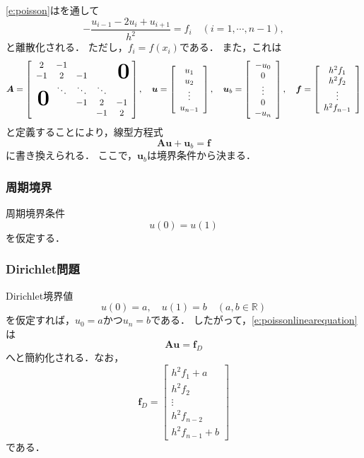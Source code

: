 \eqref{e:poisson}はを通して
$$
-\frac{u_{i-1}-2u_i+u_{i+1}}{h^2}=f_i\quad(i=1,\cdots,n-1),
$$
と離散化される．
ただし，$f_i=f(x_i)$である．
また，これは
\begin{equation}
\bm{A}=\left[\begin{array}{ccccc}
	2&-1&&&\\
	-1&2&-1&&\hsymb{\bm{0}}\\
	&\ddots&\ddots&\ddots&\\
	\hsymb{\bm{0}}&&-1&2&-1\\
	&&&-1&2
	\end{array}\right],\quad
\bm{u}=\left[\begin{array}{c}
	u_1\\
	u_2\\
	\vdots\\
	u_{n-1}
	\end{array}\right],\quad
\bm{u}_b=\left[\begin{array}{c}
	-u_0\\
	0\\
	\vdots\\
	0\\
	-u_{n}
	\end{array}\right],\quad
\bm{f}=\left[\begin{array}{c}
	h^2 f_1\\
	h^2 f_2\\
	\vdots\\
	h^2 f_{n-1}
	\end{array}\right]	
\end{equation}
と定義することにより，線型方程式
\begin{equation}
\label{e:poissonlinearequation}
\bm{A}\bm{u}+\bm{u}_{b}=\bm{f}
\end{equation}
に書き換えられる．
ここで，$\bm{u}_b$は境界条件から決まる．

\subsubsection{周期境界}
周期境界条件
\begin{equation}
\label{e:1dperiodic}
u(0)=u(1)
\end{equation}
を仮定する．

\subsubsection{Dirichlet問題}
Dirichlet境界値
\begin{equation}
\label{e:1dstationarydirichlet}
u(0)=a,\quad u(1)=b\quad(a,b\in\mathbb{R})
\end{equation}
を仮定すれば，$u_0=a$かつ$u_{n}=b$である．
したがって，\eqref{e:poissonlinearequation}は
$$
\bm{A}\bm{u}=\bm{f}_D
$$
へと簡約化される．なお，
\begin{equation*}
\bm{f}_D=\left[\begin{array}{c}
	h^2 f_1+a\\
	h^2 f_2\\
	\vdots\\
	h^2 f_{n-2}\\
	h^2 f_{n-1}+b
	\end{array}\right]	
\end{equation*}
である．

